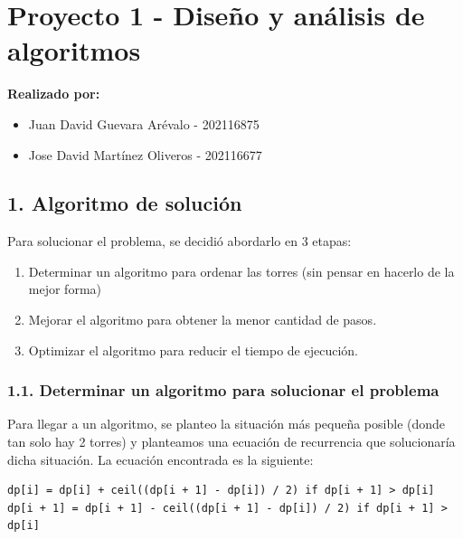\documentclass[
]{article}
\author{}
\date{}
\providecommand{\tightlist}{%
  \setlength{\itemsep}{0pt}\setlength{\parskip}{0pt}}
\begin{document}
\hypertarget{proyecto-1---diseuxf1o-y-anuxe1lisis-de-algoritmos}{%
\section{Proyecto 1 - Diseño y análisis de
algoritmos}\label{proyecto-1---diseuxf1o-y-anuxe1lisis-de-algoritmos}}

\textbf{Realizado por:}

\begin{itemize}
\tightlist
\item
  Juan David Guevara Arévalo - 202116875
\item
  Jose David Martínez Oliveros - 202116677
\end{itemize}

\hypertarget{algoritmo-de-soluciuxf3n}{%
\subsection{1. Algoritmo de solución}\label{algoritmo-de-soluciuxf3n}}

Para solucionar el problema, se decidió abordarlo en 3 etapas:

\begin{enumerate}
\def\labelenumi{\arabic{enumi}.}
\tightlist
\item
  Determinar un algoritmo para ordenar las torres (sin pensar en hacerlo
  de la mejor forma)
\item
  Mejorar el algoritmo para obtener la menor cantidad de pasos.
\item
  Optimizar el algoritmo para reducir el tiempo de ejecución.
\end{enumerate}

\hypertarget{determinar-un-algoritmo-para-solucionar-el-problema}{%
\subsubsection{1.1. Determinar un algoritmo para solucionar el
problema}\label{determinar-un-algoritmo-para-solucionar-el-problema}}

Para llegar a un algoritmo, se planteo la situación más pequeña posible
(donde tan solo hay 2 torres) y planteamos una ecuación de recurrencia
que solucionaría dicha situación. La ecuación encontrada es la
siguiente:

\begin{verbatim}
dp[i] = dp[i] + ceil((dp[i + 1] - dp[i]) / 2) if dp[i + 1] > dp[i]
dp[i + 1] = dp[i + 1] - ceil((dp[i + 1] - dp[i]) / 2) if dp[i + 1] > dp[i]
\end{verbatim}
\end{document}
